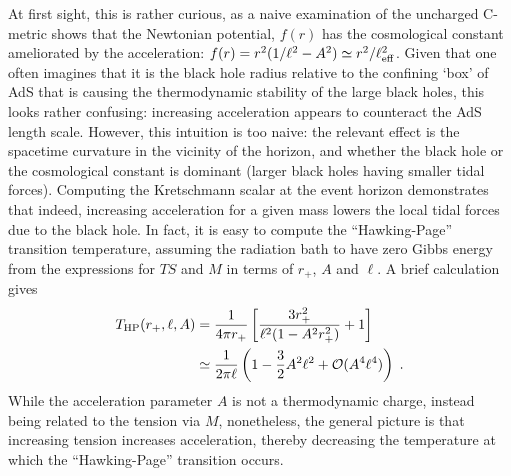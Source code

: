 \documentclass[
twoside,
openright,
frontopenright,
]{dmathesis}
\newcommand{\nn}{\nonumber}
\begin{document}
At first sight, this is rather curious, as a naive examination of the uncharged
C-metric shows that the Newtonian potential, $f(r)$ has the cosmological
constant ameliorated by the acceleration:
$f(r) = r^2 (1 / \ell^2 - A^2) \simeq r^2/\ell_{\rm eff}^2$. Given that one
often imagines that it is the black hole radius relative to the confining `box'
of AdS that is causing the thermodynamic stability of the large black holes,
this looks rather confusing: increasing acceleration appears to counteract the
AdS length scale. However, this intuition is too naive: the relevant effect is
the spacetime curvature in the vicinity of the horizon, and whether the black
hole or the cosmological constant is dominant (larger black holes having smaller
tidal forces). Computing the Kretschmann scalar at the event horizon
demonstrates that indeed, increasing acceleration for a given mass lowers the
local tidal forces due to the black hole.  In fact, it is easy to compute the
``Hawking-Page'' transition temperature, assuming the radiation bath to have
zero Gibbs energy from the expressions for $TS$ and $M$ in terms of $r_+$, $A$
and $\ell$. A brief calculation gives
\begin{align}
T_\mathrm{HP} (r_+, \ell, A) &= \frac{1}{4\pi r_+ }\left [
\frac{ 3r_+^2}{\ell^2 ( 1- A^2 r_+^2) } + 1 \right ]\nn\\
& \simeq \frac{1}{2\pi \ell} \left ( 1 - \frac32 A^2 \ell^2 + {\cal{O}} (A^4 \ell^4) \right)
\;.
\end{align}
While the acceleration parameter $A$ is not a thermodynamic charge, instead
being related to the tension via $M$, nonetheless, the general picture is that
increasing tension increases acceleration, thereby decreasing the temperature at
which the ``Hawking-Page'' transition occurs.
\end{document}
